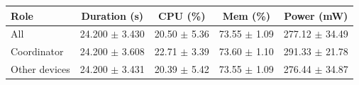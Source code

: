 \begin{tabular}{lcccc}
\hline
\textbf{Role} & \textbf{Duration (s)} & \textbf{CPU (\%)} & \textbf{Mem (\%)} & \textbf{Power (mW)} \\
\hline
All & 24.200 $\pm$ 3.430 & 20.50 $\pm$ 5.36 & 73.55 $\pm$ 1.09 & 277.12 $\pm$ 34.49 \\
Coordinator & 24.200 $\pm$ 3.608 & 22.71 $\pm$ 3.39 & 73.60 $\pm$ 1.10 & 291.33 $\pm$ 21.78 \\
Other devices & 24.200 $\pm$ 3.431 & 20.39 $\pm$ 5.42 & 73.55 $\pm$ 1.09 & 276.44 $\pm$ 34.87 \\
\hline
\end{tabular}
